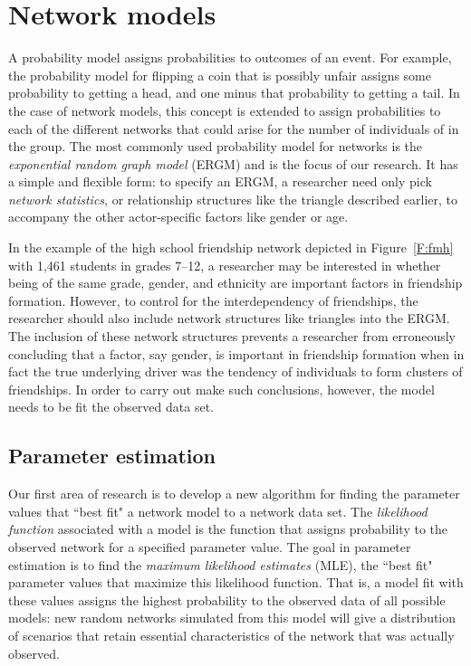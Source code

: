 \documentclass[12pt]{article}
\begin{document}
\section{Network models}
A probability model assigns probabilities to outcomes of an event.  For example, 
the probability model for flipping a coin that is possibly unfair assigns some 
probability to getting a head, and one minus that probability to getting a tail.  
In the case of network models, this concept is  
extended to assign probabilities to each of the different networks that could 
arise for the number of individuals of in the group.
The most commonly used probability model for networks is the 
\textit{exponential random graph model} (ERGM) 
\citep{Wasserman:1996,Pattison:1999,logit,Snijders:2002,introp*,ergm} and 
is the focus of our research.  It has a simple and flexible form:
to specify an ERGM, a researcher need only pick \textit{network statistics}, 
or relationship structures 
like the triangle described earlier, to accompany the other actor-specific 
factors like gender or age.  

In the example of the high school friendship network depicted in 
Figure~\ref{F:fmh} with 1,461 students in grades 7--12, a researcher may 
be interested in whether being of the same grade, gender,
and ethnicity are important factors in friendship formation.  
However, to control for the interdependency of friendships, the 
researcher should also include network structures like triangles
into the ERGM.  The inclusion of these network structures
prevents a researcher from erroneously concluding
that a factor, say gender, is important in friendship formation when in 
fact the true underlying driver was the tendency of individuals to form
clusters of friendships.  In order to carry out make such conclusions, however, 
the model needs to be fit the observed data set.

\subsection{Parameter estimation}
Our first area of research is to develop a new algorithm for finding the
parameter values that ``best fit" a network model to a network data set.
The \emph{likelihood function} associated with a model is the function 
that assigns probability to the observed network for a specified parameter value.
The goal in parameter estimation is to find the \textit{maximum likelihood 
estimates} (MLE), the ``best fit"
parameter values that maximize this likelihood function.  That is, a model 
fit with these values assigns the highest probability to the observed data of 
all possible models: new random networks simulated from this model will give a distribution of scenarios that retain essential characteristics of the network
that was actually observed.
\end{document}
